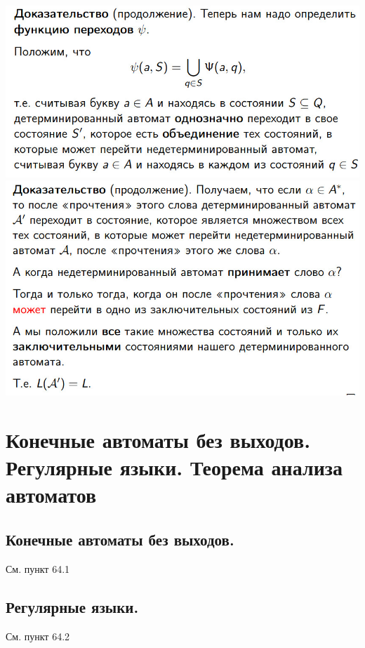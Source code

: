 \documentclass[12pt]{article}
\begin{document}
	\includegraphics[width=400pt]{56}\\
	\includegraphics[width=400pt]{57}

\section{Конечные автоматы без выходов. Регулярные языки. Теорема анализа автоматов}
\subsection{Конечные автоматы без выходов.}
	См. пункт 64.1
\subsection{Регулярные языки.}
	См. пункт 64.2
\end{document}
